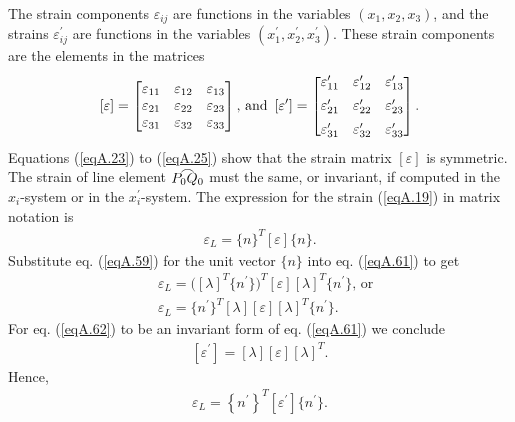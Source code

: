 \documentclass{AeroStructure-ERJohnson}
\def\tfrown#1{\overset{\smash{\lower3pt\hbox{$\frown$}}}{#1}}
\begin{document}
The strain components $\varepsilon_{i j}$ are functions in the variables $(x_{1}, x_{2}, x_{3})$, and the strains $\varepsilon_{i j}^{\prime}$ are functions in the variables $(x_{1}^{\prime}, x_{2}^{\prime}, x_{3}^{\prime})$. These strain components are the elements in the matrices
\begin{align}\label{eqA.60}
[\varepsilon]=\left[\begin{array}{@{}lll@{}}\varepsilon_{11} & \varepsilon_{12} & \varepsilon_{13} \\\varepsilon_{21} & \varepsilon_{22} & \varepsilon_{23} \\\varepsilon_{31} & \varepsilon_{32} & \varepsilon_{33}\end{array}\right]\mbox{, and } \left[\varepsilon^{\prime}\right]=\left[\begin{array}{@{}lll@{}}
\varepsilon_{11}^{\prime} & \varepsilon_{12}^{\prime} & \varepsilon_{13}^{\prime} \\[5pt]\varepsilon_{21}^{\prime} & \varepsilon_{22}^{\prime} & \varepsilon_{23}^{\prime} \\[5pt]\varepsilon_{31}^{\prime} & \varepsilon_{32}^{\prime} & \varepsilon_{33}^{\prime}\end{array}\right].
\end{align}
Equations (\ref{eqA.23}) to (\ref{eqA.25}) show that the strain matrix $[\varepsilon]$ is symmetric. The strain of line element $\tfrown{P_{0} Q_{0}}$ must the same, or invariant, if computed in the $x_{i}$-system or in the $x_{i}^{\prime}$-system. The expression for the strain (\ref{eqA.19}) in matrix notation is
\begin{align}\label{eqA.61}
\varepsilon_{L}=\{n\}^{T}[\varepsilon]\{n\}.
\end{align}
Substitute eq. (\ref{eqA.59}) for the unit vector $\{n\}$ into eq. (\ref{eqA.61}) to get
\begin{align}
&\varepsilon_{L}=\big([\lambda]^{T}\{n^{\prime}\}\big)^{T}[\varepsilon][\lambda]^{T}\{n^{\prime}\}\mbox{, or}\nonumber\\
&\varepsilon_{L}=\{n^{\prime}\}^{T}[\lambda][\varepsilon][\lambda]^{T}\{n^{\prime}\}.\label{eqA.62}
\end{align}
For eq. (\ref{eqA.62}) to be an invariant form of eq. (\ref{eqA.61}) we conclude
\begin{align}\label{eqA.63}
[\varepsilon^{\prime}]=[\lambda][\varepsilon][\lambda]^{T}.
\end{align}
Hence,
\begin{align}\label{eqA.64}
\varepsilon_{L}=\left\{n^{\prime}\right\}^{T}[\varepsilon^{\prime}]\{n^{\prime}\}.
\end{align}
\end{document}
